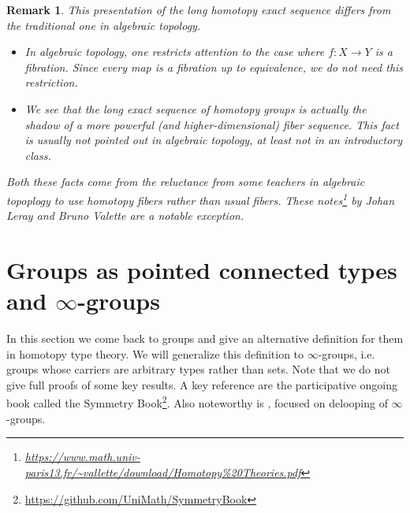 \documentclass{article}
\newcommand{\se}[1]{\medbreak \medbreak \section{#1}}
\renewcommand{\r}{\rightarrow}
\newtheorem{definition}{Definition}
\newtheorem{remark}{Remark}
\begin{document}
\begin{remark}
This presentation of the long homotopy exact sequence differs from the traditional one in algebraic topology.
\begin{itemize}
\item In algebraic topology, one restricts attention to the case where $f:X\r Y$ is a fibration. Since every map is a fibration up to equivalence, we do not need this restriction.
\item We see that the long exact sequence of homotopy groups is actually the shadow of a more powerful (and higher-dimensional) fiber sequence. This fact is usually not pointed out in algebraic topology, at least not in an introductory class.
\end{itemize}
Both these facts come from the reluctance from some teachers in algebraic topoplogy to use homotopy fibers rather than usual fibers. These notes\footnote{\url{https://www.math.univ-paris13.fr/~vallette/download/Homotopy\%20Theories.pdf}} by Johan Leray and Bruno Valette are a notable exception. %
\end{remark}









\se{Groups as pointed connected types and $\infty$-groups}

In this section we come back to groups and give an alternative definition for them in homotopy type theory. We will generalize this definition to $\infty$-groups, i.e. groups whose carriers are arbitrary types rather than sets. Note that we do not give full proofs of some key results. A key reference are the participative ongoing book called the Symmetry Book\footnote{\url{https://github.com/UniMath/SymmetryBook}}. Also noteworthy is \cite{buchholtz2018higher}, focused on delooping of $\infty$-groups.
\end{document}
